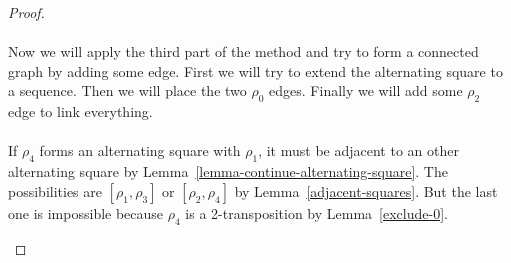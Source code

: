 \begin{proof}
\paragraph{}
Now we will apply the third part of the method and try to form a connected graph by adding some edge. First we will try to extend the alternating square to a sequence. Then we will place the two $\rho_0$ edges. Finally we will add some $\rho_2$ edge to link everything.

\paragraph{}
If $\rho_4$ forms an alternating square with $\rho_1$, it must be adjacent to an other alternating square by Lemma~\ref{lemma-continue-alternating-square}. The possibilities are $[\rho_1, \rho_3]$ or $[\rho_2, \rho_4]$ by Lemma~\ref{adjacent-squares}. But the last one is impossible because $\rho_4$ is a 2-transposition by Lemma~\ref{exclude-0}.

\begin{figure}[H]
  \begin{center}
    \caption{}
    \label{proof-5-3}
  \end{center}
\end{figure}


\end{proof}
